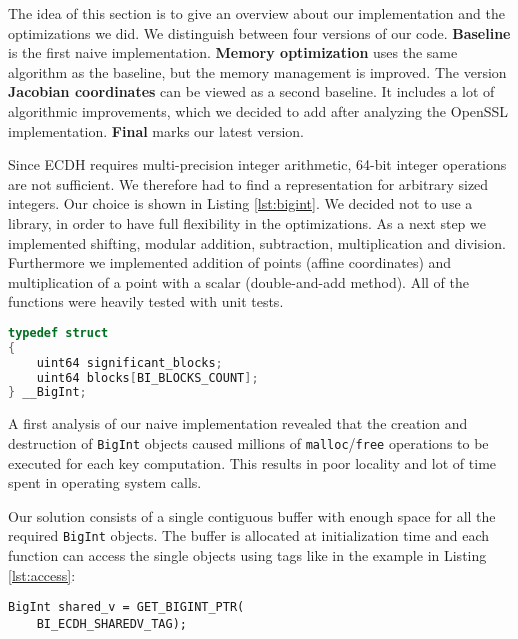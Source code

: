 The idea of this section is to give an overview about our implementation and the optimizations we did. We distinguish between four versions of our code. \textbf{Baseline} is the first naive implementation. \textbf{Memory optimization} uses the same algorithm as the baseline, but the memory management is improved. The version \textbf{Jacobian coordinates} can be viewed as a second baseline. It includes a lot of algorithmic improvements, which we decided to add after analyzing the OpenSSL implementation. \textbf{Final} marks our latest version.

Since ECDH requires multi-precision integer arithmetic, 64-bit integer operations are not sufficient. We therefore had to find a representation for arbitrary sized integers. Our choice is shown in Listing \ref{lst:bigint}. We decided not to use a library, in order to have full flexibility in the optimizations. As a next step we implemented shifting, modular addition, subtraction, multiplication and division. Furthermore we implemented addition of points (affine coordinates) and multiplication of a point with a scalar (double-and-add method). All of the functions were heavily tested with unit tests.

\begin{lstlisting}[frame=single,  captionpos=b, caption=representation of the arbitrary size integers, label=lst:bigint, language=c]
typedef struct 
{
    uint64 significant_blocks;    
    uint64 blocks[BI_BLOCKS_COUNT]; 
} __BigInt;
\end{lstlisting}


A first analysis of our naive implementation revealed that the creation and destruction of \texttt{BigInt} objects caused millions of \texttt{malloc}/\texttt{free} operations to be executed for each key computation. This results in poor locality and lot of time spent in operating system calls.

Our solution consists of a single contiguous buffer with enough space for all the required \texttt{BigInt} objects. The buffer is allocated at initialization time and each function can access the single objects using tags like in the example in Listing \ref{lst:access}:

\begin{lstlisting}[frame=single, mathescape=true, captionpos=b, label=lst:access, caption=Access by tag example]
BigInt shared_v = GET_BIGINT_PTR(
    BI_ECDH_SHAREDV_TAG);
\end{lstlisting}

